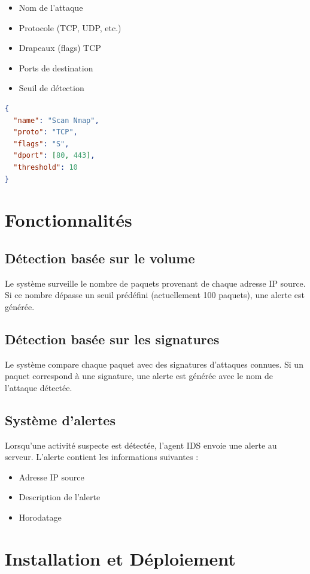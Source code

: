 \documentclass[12pt,a4paper]{article}
\begin{document}
\begin{itemize}
    \item Nom de l'attaque
    \item Protocole (TCP, UDP, etc.)
    \item Drapeaux (flags) TCP
    \item Ports de destination
    \item Seuil de détection
\end{itemize}

\begin{lstlisting}[language=JSON, caption=Exemple de signature]
{
  "name": "Scan Nmap",
  "proto": "TCP",
  "flags": "S",
  "dport": [80, 443],
  "threshold": 10
}
\end{lstlisting}

\section{Fonctionnalités}

\subsection{Détection basée sur le volume}
Le système surveille le nombre de paquets provenant de chaque adresse IP source. Si ce nombre dépasse un seuil prédéfini (actuellement 100 paquets), une alerte est générée.

\subsection{Détection basée sur les signatures}
Le système compare chaque paquet avec des signatures d'attaques connues. Si un paquet correspond à une signature, une alerte est générée avec le nom de l'attaque détectée.

\subsection{Système d'alertes}
Lorsqu'une activité suspecte est détectée, l'agent IDS envoie une alerte au serveur. L'alerte contient les informations suivantes :
\begin{itemize}
    \item Adresse IP source
    \item Description de l'alerte
    \item Horodatage
\end{itemize}

\section{Installation et Déploiement}
\end{document}

